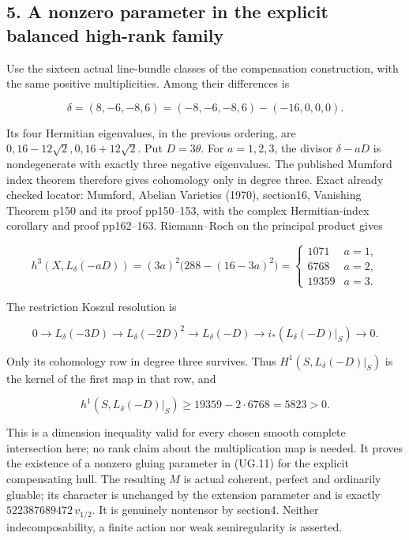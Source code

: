 \subsection{5. A nonzero parameter in the explicit balanced high-rank
family}\label{SF-UG-a-nonzero-parameter-in-the-explicit-balanced-high-rank-family}

Use the sixteen actual line-bundle classes of the compensation
construction, with the same positive multiplicities. Among their
differences is

\[
 \delta=(8,-6,-8,6)
 =(-8,-6,-8,6)-(-16,0,0,0).
\]

Its four Hermitian eigenvalues, in the previous ordering, are
\(0,16-12\sqrt2,0,16+12\sqrt2\). Put \(D=3\theta\). For \(a=1,2,3\), the
divisor \(\delta-aD\) is nondegenerate with exactly three negative
eigenvalues. The published Mumford index theorem therefore gives
cohomology only in degree three. Exact already checked locator: Mumford,
Abelian Varieties (1970), section16, Vanishing Theorem p150 and its
proof pp150--153, with the complex Hermitian-index corollary and proof
pp162--163. Riemann--Roch on the principal product gives

\[
 h^3(X,L_\delta(-aD))
  =(3a)^2\bigl(288-(16-3a)^2\bigr)
   =\begin{cases}1071&a=1,\\6768&a=2,\\19359&a=3.\end{cases}
 \tag{UG.12}
\]

The restriction Koszul resolution is

\[
 0\to L_\delta(-3D)\to L_\delta(-2D)^2
    \to L_\delta(-D)\to i_*(L_\delta(-D)|_S)\to0.
\]

Only its cohomology row in degree three survives. Thus
\(H^1(S,L_\delta(-D)|_S)\) is the kernel of the first map in that row,
and

\[
 h^1(S,L_\delta(-D)|_S)\ge19359-2\cdot6768=5823>0.
 \tag{UG.13}
\]

This is a dimension inequality valid for every chosen smooth complete
intersection here; no rank claim about the multiplication map is needed.
It proves the existence of a nonzero gluing parameter in (UG.11) for the
explicit compensating hull. The resulting \(M\) is actual coherent,
perfect and ordinarily gluable; its character is unchanged by the
extension parameter and is exactly \(522387689472\,v_{1/2}\). It is
genuinely nontensor by section4. Neither indecomposability, a finite
action nor weak semiregularity is asserted.

